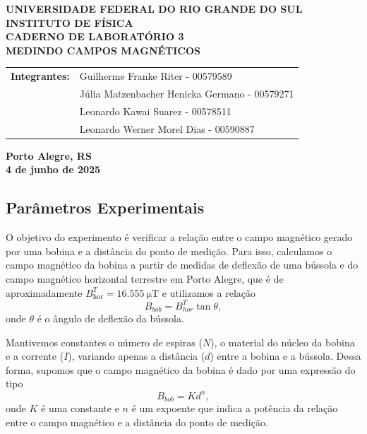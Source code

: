 \documentclass[12pt, a4paper]{article}
\begin{document}
\begin{center}
    \textbf{\large UNIVERSIDADE FEDERAL DO RIO GRANDE DO SUL} \\
    \textbf{\large INSTITUTO DE FÍSICA} \\
    \vspace{3cm}
    \textbf{\Large CADERNO DE LABORATÓRIO 3} \\
    \vspace{1cm}
    \textbf{\large MEDINDO CAMPOS MAGNÉTICOS} \\
    \vspace{3cm}
    
    \begin{tabular}{rl}
        \textbf{Integrantes:} & Guilherme Franke Riter - 00579589 \\
                               & Júlia Matzenbacher Henicka Germano - 00579271 \\
                               & Leonardo Kawai Suarez - 00578511 \\
                               & Leonardo Werner Morel Dias - 00590887 \\
    \end{tabular}
    
    \vspace{12cm}
    \textbf{\large Porto Alegre, RS} \\
    \textbf{\large 4 de junho de 2025} \\
\end{center}\newpage

\subsection*{Parâmetros Experimentais}

O objetivo do experimento é verificar a relação entre o campo magnético gerado por uma bobina e a distância do ponto de medição. Para isso, calculamos o campo magnético da bobina a partir de medidas de deflexão de uma bússola e do campo magnético horizontal terrestre em Porto Alegre, que é de aproximadamente $B_{\text{hor}}^{T} = \SI{16.555}{\micro\tesla}$ e utilizamos a relação \[B_{bob}=B_{hor}^T\tan\theta,\] onde $\theta$ é o ângulo de deflexão da bússola.

Mantivemos constantes o número de espiras ($N$), o material do núcleo da bobina e a corrente ($I$), variando apenas a distância ($d$) entre a bobina e a bússola. Dessa forma, supomos que o campo magnético da bobina é dado por uma expressão do tipo \[B_{bob} = Kd^n,\] onde $K$ é uma constante e $n$ é um expoente que indica a potência da relação entre o campo magnético e a distância do ponto de medição. 
\end{document}

